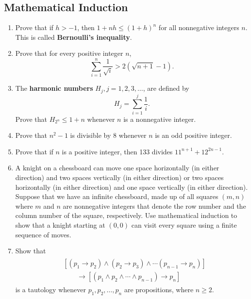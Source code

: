 \documentclass{../../cls/sig-alternate-05-2015}
\begin{document}
\subsection{Mathematical Induction}
\begin{enumerate}
\item Prove that if $h > -1$, then $1 + nh \le (1 + h)^n$ for all nonnegative integers $n$. This is called \textbf{Bernoulli's inequality}.

\item Prove that for every positive integer $n$,
\begin{equation}
    \sum_{i = 1}^{n} \frac{1}{\sqrt{i}} > 2(\sqrt{n + 1} - 1).
\end{equation}

\item The \textbf{harmonic numbers} $H_j, j = 1, 2, 3, \ldots$, are defined by \begin{equation}
    H_j = \sum_{i = 1}^j \frac{1}{i}.
\end{equation}
Prove that $H_{2^n} \le 1 + n$ whenever $n$ is a nonnegative integer.

\item Prove that $n^2 - 1$ is divisible by 8 whenever $n$ is an odd positive integer.

\item Prove that if $n$ is a positive integer, then 133 divides
$11^{n + 1} + 12^{2n - 1}.$

\item A knight on a chessboard can move one space horizontally
(in either direction) and two spaces vertically (in
either direction) or two spaces horizontally (in either direction)
and one space vertically (in either direction).
Suppose that we have an infinite chessboard,
made up of all squares $(m, n)$ where $m$ and $n$ are nonnegative integers that denote the row number and the column number of the square,
respectively.
Use mathematical induction to show that a knight starting at $(0, 0)$ can visit every square using a finite sequence of moves.

\item Show that \begin{align}
\begin{aligned}
	& [(p_1 \rightarrow p_2) \land (p_2 \rightarrow p_3) \land \cdots (p_{n - 1} \rightarrow p_{n})]\\
	& \qquad \rightarrow [(p_1 \land p_2 \land \cdots \land p_{n - 1}) \rightarrow p_{n}]
\end{aligned}
\end{align} is a tautology whenever $p_1, p_2, \ldots, p_n$ are propositions, where $n \ge 2$.


\end{enumerate}
\end{document}
